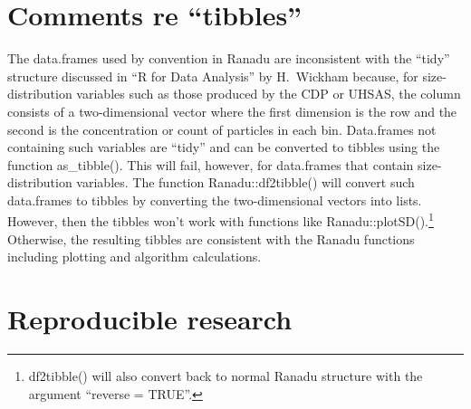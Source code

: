 \documentclass[12pt,english]{report}\usepackage[]{graphicx}\usepackage[]{color}
\begin{document}
\section{Comments re ``tibbles''}

The data.frames used by convention in Ranadu are inconsistent with
the ``tidy'' structure discussed in ``R for Data Analysis'' by
H.~Wickham because, for size-distribution variables such as those
produced by the CDP or UHSAS, the column consists of a two-dimensional
vector where the first dimension is the row and the second is the
concentration or count of particles in each bin. Data.frames not containing
such variables are ``tidy'' and can be converted to tibbles using
the function as\_tibble(). This will fail, however, for data.frames
that contain size-distribution variables. The function Ranadu::df2tibble()
will convert such data.frames to tibbles by converting the two-dimensional
vectors into lists. However, then the tibbles won't work with functions
like Ranadu::plotSD().\footnote{df2tibble() will also convert back to normal Ranadu structure with
the argument ``reverse = TRUE''.} Otherwise, the resulting tibbles are consistent with the Ranadu functions
including plotting and algorithm calculations.

\section{Reproducible research}
\end{document}
